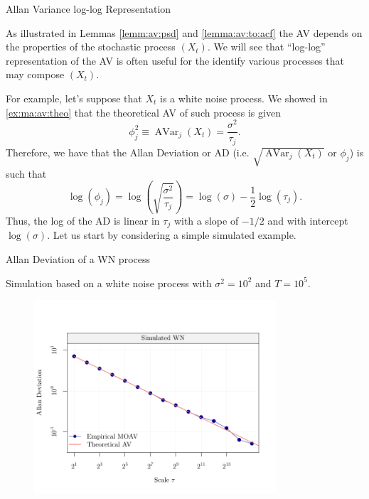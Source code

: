 \documentclass[envcountsect,usenames,dvipsnames]{beamer}
\DeclareMathOperator{\AV}{AVar}
\theoremstyle{mystyle}
\begin{document}
\begin{frame}{Allan Variance log-log Representation}
\small

    As illustrated in Lemmas \ref{lemm:av:psd} and \ref{lemma:av:to:acf} the AV depends on the properties of the stochastic process $(X_t)$. We will see that ``log-log'' representation of the AV is often useful for the identify various processes that may compose $(X_t)$.
     \vspace{0.25cm}
     
    For example, let's suppose that $X_t$ is a white noise process. We showed in \ref{ex:ma:av:theo} that the theoretical AV of such process is given
    \begin{equation*}
        \phi_j^2 \equiv \AV_j(X_t) = \frac{\sigma^2}{\tau_j}.
    \end{equation*}
    Therefore, we have that the Allan Deviation or AD (i.e. $\sqrt{\AV_j(X_t)}$ or $\phi_j$) is such that
    \begin{equation}
       \log\left( \phi_j \right) = \log \left(\sqrt{\frac{\sigma^2}{\tau_j}}\right) = \log \left(\sigma\right) - \frac{1}{2} \log (\tau_j).
       \label{eq:av:wn}
    \end{equation}
    Thus, the log of the AD is linear in $\tau_j$ with a slope of $-1/2$ and with intercept $\log (\sigma)$. Let us start by considering a simple simulated example.
    
\end{frame}

\begin{frame}{Allan Deviation of a WN process}
    \begin{block}{ }
    Simulation based on a white noise process with $\sigma^2 = 10^2$ and $T = 10^5$.
    \end{block}
    
    \vspace{-1cm}
\begin{figure}
	    \centering
	  \includegraphics[width = 9cm]{Images/av_example_wn.pdf}
	\end{figure}
	
\end{frame}
\end{document}
